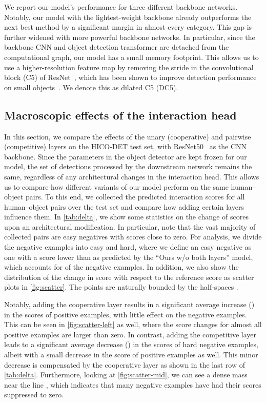 \documentclass[10pt,twocolumn,letterpaper]{article}
\begin{document}
We report our model's performance for three different backbone networks. Notably, our model with the lightest-weight backbone already outperforms the next best method by a significant margin in almost every category. This gap is further widened with more powerful backbone networks. In particular, since the backbone CNN and object detection transformer are detached from the computational graph, our model has a small memory footprint. This allows us to use a higher-resolution feature map by removing the stride in the  convolutional block (C5) of ResNet~\cite{resnet}, which has been shown to improve detection performance on small objects~\cite{detr}. We denote this as dilated C5 (DC5).

\subsection{Macroscopic effects of the interaction head}
\label{sec:macro}

In this section, we compare the effects of the unary (cooperative) and pairwise (competitive) layers on the HICO-DET test set, with ResNet50~\cite{resnet} as the CNN backbone.
Since the parameters in the object detector are kept frozen for our model, the set of detections processed by the downstream network remains the same, regardless of any architectural changes in the interaction head. This allows us to compare how different variants of our model perform on the same human--object pairs. To this end, we collected the predicted interaction scores for all human--object pairs over the test set and compare how adding certain layers influence them. In \cref{tab:delta}, we show some statistics on the change of scores upon an architectural modification. In particular, note that the vast majority of collected pairs are easy negatives with scores close to zero. For analysis, we divide the negative examples into easy and hard, where we define an easy negative as one with a score lower than  as predicted by the ``Ours w/o both layers'' model, which accounts for  of the negative examples. In addition, we also show the distribution of the change in score with respect to the reference score as scatter plots in \cref{fig:scatter}. The points are naturally bounded by the half-spaces .

Notably, adding the cooperative layer results in a significant average increase () in the scores of positive examples, with little effect on the negative examples. This can be seen in \cref{fig:scatter-left} as well, where the score changes for almost all positive examples are larger than zero.
In contrast, adding the competitive layer leads to a significant average decrease () in the scores of hard negative examples, albeit with a small decrease in the score of positive examples as well. This minor decrease is compensated by the cooperative layer as shown in the last row of \cref{tab:delta}. Furthermore, looking at \cref{fig:scatter-mid}, we can see a dense mass near the line , which indicates that many negative examples have had their scores suppressed to zero.
\end{document}
